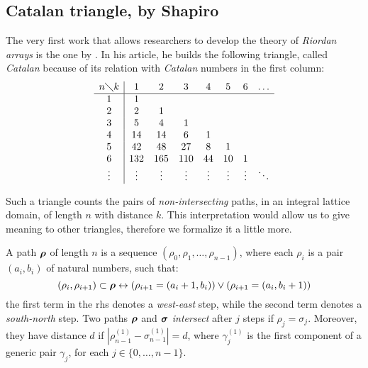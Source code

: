 
\subsection{Catalan triangle, by Shapiro}

The very first work that allows researchers to develop the theory of
\emph{Riordan arrays} is the one by \citeauthor{shapiro:1976}
\cite{shapiro:1976}. In his article, he builds the following triangle, called
\emph{Catalan} because of its relation with \emph{Catalan} numbers in the first
column:
\begin{equation}
    \begin{array}{c|ccccccc}
        n\diagdown k & 1 & 2 & 3 & 4 & 5 & 6&\ldots\\
        \hline
        1&1 & & & & & &\\
        2&2 &1 & & & & &\\
        3&5 &4 &1 & & & &\\
        4&14 &14 &6 &1 & & &\\
        5&42 &48 &27 &8 &1 & &\\
        6&132 &165 &110 &44 &10 &1& \\
        \vdots&\vdots&\vdots&\vdots&\vdots&\vdots&\vdots&\ddots \\
    \end{array}
    \label{eq:shapiro:catalan:triangle:expanded}
\end{equation}

Such a triangle counts the pairs of \emph{non-intersecting} paths, in an
integral lattice domain, of length $n$ with distance $k$. This interpretation
would allow us to give meaning to other triangles, 
therefore we formalize it a little more.

A path $\boldsymbol{\rho}$ of length $n$ is a sequence $(\rho_{0},\rho_{1},\ldots,\rho_{n-1})$,
where each $\rho_{i}$ is a pair $(a_{i},b_{i})$ of natural numbers, such that:
\begin{displaymath}
    (\rho_{i},\rho_{i+1})\subset\boldsymbol{\rho} \leftrightarrow
    (\rho_{i+1}=(a_{i}+1,b_{i})) \vee 
    (\rho_{i+1}=(a_{i},b_{i}+1)) 
\end{displaymath}
the first term in the \ac{rhs} denotes a \emph{west-east} step, while the second
term denotes a \emph{south-north} step. Two paths $\boldsymbol{\rho}$ and $\boldsymbol{\sigma}$
\emph{intersect} after $j$ steps if $\rho_{j}=\sigma_{j}$. Moreover, they have distance
$d$ if $\left|\rho_{n-1}^{(1)}-\sigma_{n-1}^{(1)}\right|=d$, where $\gamma_{j}^{(1)}$ is
the first component of a generic pair $\gamma_{j}$, for each $j\in\lbrace0,\ldots,n-1\rbrace$.

